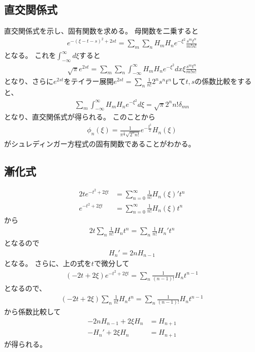 \documentclass[uplatex]{jsarticle}
\begin{document}
\subsection{直交関係式}
直交関係式を示し、固有関数を求める。
母関数を二乗すると
\begin{align*}
e^{-(\xi-t-s)^2+2st}=\sum_m\sum_nH_mH_ne^{-\xi^2}\frac{s^mt^n}{m!n!}
\end{align*}
となる。
これを$\int^\infty_{-\infty}d\xi$すると
\begin{align*}
\sqrt{\pi}e^{2st}=\sum_m\sum_n\int^\infty_{-\infty}H_mH_ne^{-\xi^2}dx\xi\frac{s^mt^n}{m!n!}
\end{align*}
となり、さらに$e^{2st}$をテイラー展開$e^{2st}=\sum_n\frac{1}{n!}2^ns^nt^n$して$t, s$の係数比較をすると、
\begin{align*}
\sum_m\int^\infty_{-\infty}H_mH_ne^{-\xi^2}d\xi=\sqrt{\pi}2^nn!\delta_{mn}
\end{align*}
となり、直交関係式が得られる。
このことから
\begin{align*}
\phi_n(\xi)=\frac{1}{\pi^{\frac{1}{4}}\sqrt{2^nn!}}e^{-\frac{\xi^2}{2}}H_n(\xi)
\end{align*}
がシュレディンガー方程式の固有関数であることがわかる。

\subsection{漸化式}
\begin{align*}
2te^{-t^2+2\xi t}&=\sum_{n=0}^\infty\frac{1}{n!}H_n(\xi)'t^n\\
e^{-t^2+2\xi t}&=\sum_{n=0}^\infty\frac{1}{n!}H_n(\xi)t^n
\end{align*}
から
\begin{align*}
2t\sum_n\frac{1}{n!}H_nt^n=\sum_n\frac{1}{n!}H_n't^n
\end{align*}
となるので
\begin{align*}
H_n'=2nH_{n-1}
\end{align*}
となる。
さらに、上の式を$t$で微分して
\begin{align*}
(-2t+2\xi)e^{-t^2+2\xi t}=\sum_n\frac{1}{(n-1)!}H_nt^{n-1}
\end{align*}
となるので、
\begin{align*}
(-2t+2\xi)\sum_n\frac{1}{n!}H_nt^n=\sum_n\frac{1}{(n-1)!}H_nt^{n-1}
\end{align*}
から係数比較して
\begin{align*}
-2nH_{n-1}+2\xi H_n&=H_{n+1}\\
-H_n'+2\xi H_n&=H_{n+1}
\end{align*}
が得られる。
\end{document}
